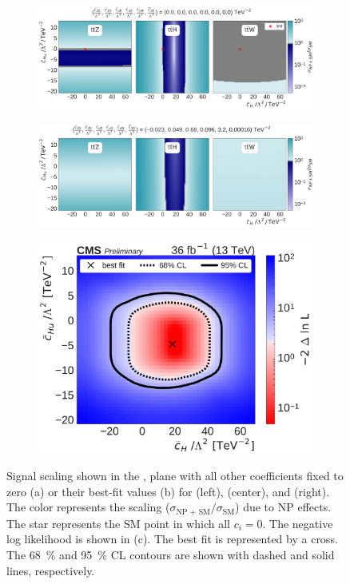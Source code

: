\begin{figure}
  \vspace{-1cm}
  \begin{subfigure}{\linewidth}
    \centering
    \includegraphics[width=\linewidth]{figures/thirteen-TeV/scaling-frozen/cH_cHu}
    \caption{}
  \end{subfigure}
  \begin{subfigure}{\linewidth}
    \centering
    \includegraphics[width=\linewidth]{figures/thirteen-TeV/scaling/cH_cHu}
    \caption{}
  \end{subfigure}
  \begin{subfigure}{\linewidth}
    \centering
    \includegraphics[width=0.6\linewidth]{figures/thirteen-TeV/nll/cH_cHu}
    \caption{}
  \end{subfigure}
  \vspace{-1cm}
  \setlength{\capwidth}{15cm}
  \caption[Signal scaling and profile likelihood scan in the \cHu, \cH plane]{Signal scaling shown
  in the \cHu, \cH plane with all other coefficients fixed to zero (a) or their best-fit values (b)
  for \ttZ (left), \ttH (center), and \ttW (right). The color represents the scaling ($\sigma_\text{NP
  + SM} / \sigma_\text{SM}$) due to NP effects. The star represents the SM point in which all $c_i=0$.
  The negative log likelihood is shown in (c). The best fit is represented by a cross. The
  \SI{68}{\percent} and \SI{95}{\percent} CL contours are shown with dashed and solid lines,
  respectively.}
\end{figure}

